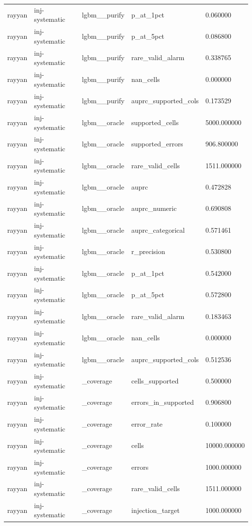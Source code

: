 \begin{tabular}{lllll}
rayyan & inj-systematic & lgbm\_\_purify & p\_at\_1pct & 0.060000 \\
rayyan & inj-systematic & lgbm\_\_purify & p\_at\_5pct & 0.086800 \\
rayyan & inj-systematic & lgbm\_\_purify & rare\_valid\_alarm & 0.338765 \\
rayyan & inj-systematic & lgbm\_\_purify & nan\_cells & 0.000000 \\
rayyan & inj-systematic & lgbm\_\_purify & auprc\_supported\_cols & 0.173529 \\
rayyan & inj-systematic & lgbm\_\_oracle & supported\_cells & 5000.000000 \\
rayyan & inj-systematic & lgbm\_\_oracle & supported\_errors & 906.800000 \\
rayyan & inj-systematic & lgbm\_\_oracle & rare\_valid\_cells & 1511.000000 \\
rayyan & inj-systematic & lgbm\_\_oracle & auprc & 0.472828 \\
rayyan & inj-systematic & lgbm\_\_oracle & auprc\_numeric & 0.690808 \\
rayyan & inj-systematic & lgbm\_\_oracle & auprc\_categorical & 0.571461 \\
rayyan & inj-systematic & lgbm\_\_oracle & r\_precision & 0.530800 \\
rayyan & inj-systematic & lgbm\_\_oracle & p\_at\_1pct & 0.542000 \\
rayyan & inj-systematic & lgbm\_\_oracle & p\_at\_5pct & 0.572800 \\
rayyan & inj-systematic & lgbm\_\_oracle & rare\_valid\_alarm & 0.183463 \\
rayyan & inj-systematic & lgbm\_\_oracle & nan\_cells & 0.000000 \\
rayyan & inj-systematic & lgbm\_\_oracle & auprc\_supported\_cols & 0.512536 \\
rayyan & inj-systematic & \_coverage & cells\_supported & 0.500000 \\
rayyan & inj-systematic & \_coverage & errors\_in\_supported & 0.906800 \\
rayyan & inj-systematic & \_coverage & error\_rate & 0.100000 \\
rayyan & inj-systematic & \_coverage & cells & 10000.000000 \\
rayyan & inj-systematic & \_coverage & errors & 1000.000000 \\
rayyan & inj-systematic & \_coverage & rare\_valid\_cells & 1511.000000 \\
rayyan & inj-systematic & \_coverage & injection\_target & 1000.000000 \\

\end{tabular}
